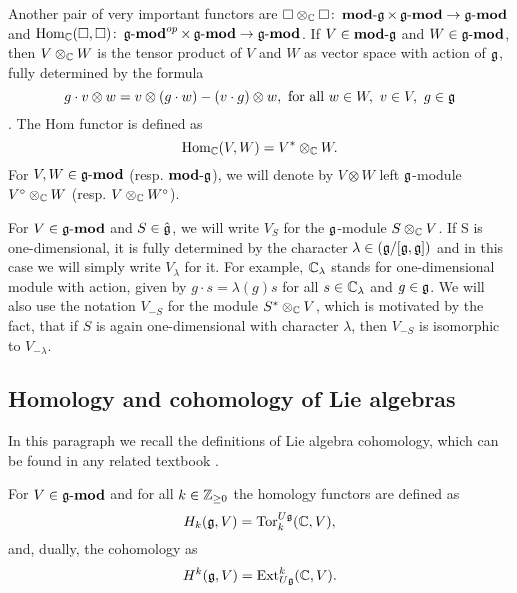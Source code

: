 Another pair of very important functors are $\square \otimes_{\mathbb{C}} \square \colon \operatorname{\mathbf{mod-\mathfrak{g}}} \times
\operatorname{\mathbf{\mathfrak{g}-mod}} \to \operatorname{\mathbf{\mathfrak{g}-mod}}$ and $\operatorname{Hom}_{\mathbb{C}}(\square, \square)\colon \operatorname{\mathbf{\mathfrak{g}-mod}}^{op} \times
\operatorname{\mathbf{\mathfrak{g}-mod}} \to \operatorname{\mathbf{\mathfrak{g}-mod}}$. If $V \in \operatorname{\mathbf{mod-\mathfrak{g}}}$ and $W \in \operatorname{\mathbf{\mathfrak{g}-mod}}$, then $V \otimes_{\mathbb{C}} W$
is the tensor product of $V$ and $W$ as vector space with action of $\mathfrak{g}$, fully determined by
the formula
\[
    g\cdot v\otimes w = v\otimes (g\cdot w) - (v\cdot g) \otimes w, \text{ for all } w\in W,~v\in
    V,~ g\in \mathfrak{g} 
\].
The Hom functor is defined as 
\[
    \operatorname{Hom}_{\mathbb{C}}(V, W)=V^* \otimes_{\mathbb{C}} W.
\]
For $V, W \in \operatorname{\mathbf{\mathfrak{g}-mod}}$ (resp. $\operatorname{\mathbf{mod-\mathfrak{g}}}$), we will denote by $V\otimes W$ left $\mathfrak{g}$-module
$V^\circ \otimes_{\mathbb{C}} W$ (resp. $V \otimes_{\mathbb{C}} W^\circ$).

For $V\in \operatorname{\mathbf{\mathfrak{g}-mod}}$ and $S \in \hat{\mathfrak{g}}$, we will write $V_{S}$ for the $\mathfrak{g}$-module
$S\otimes_{\mathbb{C}} V$.  If S is one-dimensional, it is fully determined by the character $\lambda \in
(\mathfrak{g}/[\mathfrak{g}, \mathfrak{g}])$ and in this case we will simply write $V_\lambda$ for it. For example,
$\mathbb{C}_\lambda$ stands for one-dimensional module with action, given by $g\cdot s = \lambda(g)s$ for
all $s\in \mathbb{C}_\lambda$ and $g \in \mathfrak{g}$. We will also use the notation $V_{-S}$ for the module
$S^* \otimes_{\mathbb{C}} V$, which is motivated by the fact, that if $S$ is again one-dimensional with
character $\lambda$, then $V_{-S}$ is isomorphic to $V_{-\lambda}$. 

\subsection{Homology and cohomology of Lie algebras}
In this paragraph we recall the definitions of Lie algebra cohomology, which can be found in any
related textbook .


\begin{definition}
    For $V\in \operatorname{\mathbf{\mathfrak{g}-mod}}$ and for all $k\in \mathbb{Z}_{\geq0}$ the homology functors are defined as 
    \begin{equation}
        H_k(\mathfrak{g}, V) = \mathrm{Tor}_k^{U\mathfrak{g}}(\mathbb{C}, V),
    \end{equation}
    and, dually, the cohomology as
    \begin{equation}
        H^k(\mathfrak{g}, V) = \operatorname{Ext}^k_{U\mathfrak{g}}(\mathbb{C}, V).
    \end{equation}
\end{definition}

